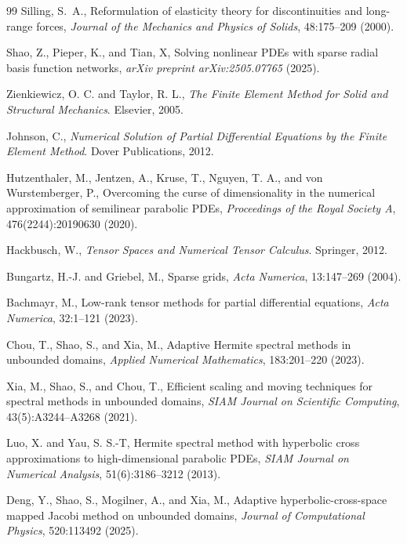 \begin{thebibliography}{99}
Silling, S.~A.,
Reformulation of elasticity theory for discontinuities and long-range forces,
\textit{Journal of the Mechanics and Physics of Solids}, 48:175--209 (2000).

Shao, Z., Pieper, K., and Tian, X,
Solving nonlinear PDEs with sparse radial basis function networks,
\textit{arXiv preprint arXiv:2505.07765} (2025).

Zienkiewicz, O. C. and Taylor, R. L.,
\textit{The Finite Element Method for Solid and Structural Mechanics}.
Elsevier, 2005.

Johnson, C.,
\textit{Numerical Solution of Partial Differential Equations by the Finite Element Method}.
Dover Publications, 2012.

Hutzenthaler, M., Jentzen, A., Kruse, T., Nguyen, T. A., and von Wurstemberger, P.,
Overcoming the curse of dimensionality in the numerical approximation of semilinear parabolic PDEs,
\textit{Proceedings of the Royal Society A}, 476(2244):20190630 (2020).

Hackbusch, W.,
\textit{Tensor Spaces and Numerical Tensor Calculus}.
Springer, 2012.

Bungartz, H.-J. and Griebel, M.,
Sparse grids,
\textit{Acta Numerica}, 13:147--269 (2004).

Bachmayr, M.,
Low-rank tensor methods for partial differential equations,
\textit{Acta Numerica}, 32:1--121 (2023).

Chou, T., Shao, S., and Xia, M.,
Adaptive Hermite spectral methods in unbounded domains,
\textit{Applied Numerical Mathematics}, 183:201--220 (2023).

Xia, M., Shao, S., and Chou, T.,
Efficient scaling and moving techniques for spectral methods in unbounded domains,
\textit{SIAM Journal on Scientific Computing}, 43(5):A3244--A3268 (2021).

Luo, X. and Yau, S. S.-T,
Hermite spectral method with hyperbolic cross approximations to high-dimensional parabolic PDEs,
\textit{SIAM Journal on Numerical Analysis}, 51(6):3186--3212 (2013).

Deng, Y., Shao, S., Mogilner, A., and Xia, M.,
Adaptive hyperbolic-cross-space mapped Jacobi method on unbounded domains,
\textit{Journal of Computational Physics}, 520:113492 (2025).


\end{thebibliography}
